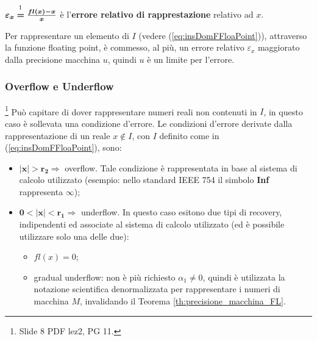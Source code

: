 \addtocounter{footnote}{-2}



\begin{definition}
	$\boldsymbol{\varepsilon_x}\overset{\footnotemark}{\boldsymbol =}\boldsymbol{\frac{fl(x)-x}{x}}$ è l'\textbf{errore relativo di rapprestazione} relativo ad $x$.
\end{definition}

Per rappresentare un elemento di $I$ (vedere (\ref{eq:insDomFFloaPoint})), attraverso la funzione floating point, è commesso, al più, un errore relativo $\varepsilon_x$ maggiorato dalla precisione macchina $u$, quindi $u$ è un limite per l'errore.

\subsubsection{Overflow e Underflow}\footnote{Slide 8 PDF lez2, PG 11.}
Può capitare di dover rappresentare numeri reali non contenuti in $I$, in questo caso è sollevata una condizione d'errore. Le condizioni d'errore derivate dalla rappresentazione di un reale $x\notin I$, con $I$ definito come in (\ref{eq:insDomFFloaPoint}), sono:
\begin{itemize}
	\item $\boldsymbol{|x|>r_2}\Rightarrow$ overflow. Tale condizione è rappresentata in base al sistema di calcolo utilizzato (esempio: nello standard IEEE 754 il simbolo \textbf{Inf} rappresenta $\infty$);
	\item $\boldsymbol{0<|x|<r_1}\Rightarrow$ underflow. In questo caso esitono due tipi di recovery, indipendenti ed associate al sistema di calcolo utilizzato (ed è possibile utilizzare solo una delle due):
	\begin{itemize}
		\item $fl(x)=0$;
		\item gradual underflow: non è più richiesto $\alpha_1\neq 0$, quindi è utilizzata la notazione scientifica denormalizzata per rappresentare i numeri di macchina $M$, invalidando il Teorema \ref{th:precisione_macchina_FL}. 
	\end{itemize}
\end{itemize}

